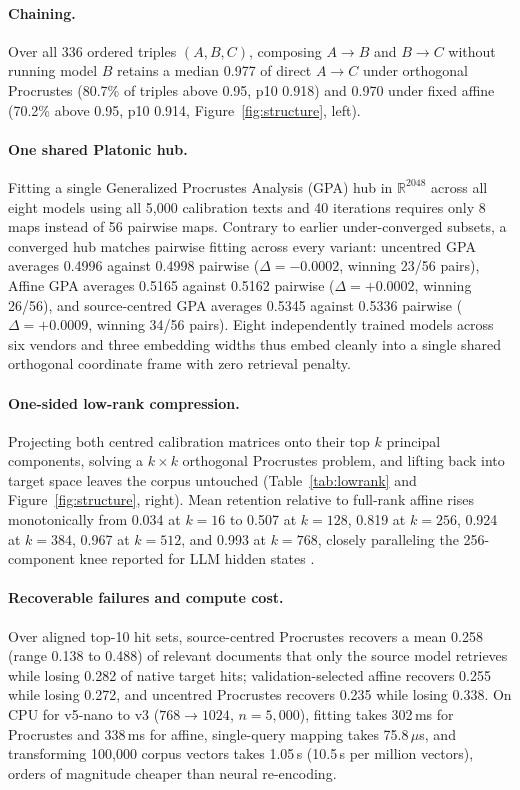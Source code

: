 \documentclass{article}
\begin{document}
\paragraph{Chaining.} Over all 336 ordered triples $(A,B,C)$, composing $A\to B$ and $B\to C$ without running model $B$ retains a median 0.977 of direct $A\to C$ under orthogonal Procrustes (80.7\% of triples above 0.95, p10 0.918) and 0.970 under fixed affine (70.2\% above 0.95, p10 0.914, Figure~\ref{fig:structure}, left).

\paragraph{One shared Platonic hub.} Fitting a single Generalized Procrustes Analysis (GPA) hub in $\mathbb{R}^{2048}$ across all eight models using all 5{,}000 calibration texts and 40 iterations requires only 8 maps instead of 56 pairwise maps. Contrary to earlier under-converged subsets, a converged hub matches pairwise fitting across every variant: uncentred GPA averages 0.4996 against 0.4998 pairwise ($\Delta=-0.0002$, winning 23/56 pairs), Affine GPA averages 0.5165 against 0.5162 pairwise ($\Delta=+0.0002$, winning 26/56), and source-centred GPA averages 0.5345 against 0.5336 pairwise ($\Delta=+0.0009$, winning 34/56 pairs). Eight independently trained models across six vendors and three embedding widths thus embed cleanly into a single shared orthogonal coordinate frame with zero retrieval penalty.

\paragraph{One-sided low-rank compression.} Projecting both centred calibration matrices onto their top $k$ principal components, solving a $k\times k$ orthogonal Procrustes problem, and lifting back into target space leaves the corpus untouched (Table~\ref{tab:lowrank} and Figure~\ref{fig:structure}, right). Mean retention relative to full-rank affine rises monotonically from 0.034 at $k=16$ to 0.507 at $k=128$, 0.819 at $k=256$, 0.924 at $k=384$, 0.967 at $k=512$, and 0.993 at $k=768$, closely paralleling the 256-component knee reported for LLM hidden states \citep{platoskey2026}.

\paragraph{Recoverable failures and compute cost.} Over aligned top-10 hit sets, source-centred Procrustes recovers a mean 0.258 (range 0.138 to 0.488) of relevant documents that only the source model retrieves while losing 0.282 of native target hits; validation-selected affine recovers 0.255 while losing 0.272, and uncentred Procrustes recovers 0.235 while losing 0.338. On CPU for v5-nano to v3 ($768\to 1024$, $n=5{,}000$), fitting takes 302\,ms for Procrustes and 338\,ms for affine, single-query mapping takes 75.8\,$\mu$s, and transforming 100{,}000 corpus vectors takes 1.05\,s (10.5\,s per million vectors), orders of magnitude cheaper than neural re-encoding.
\end{document}
